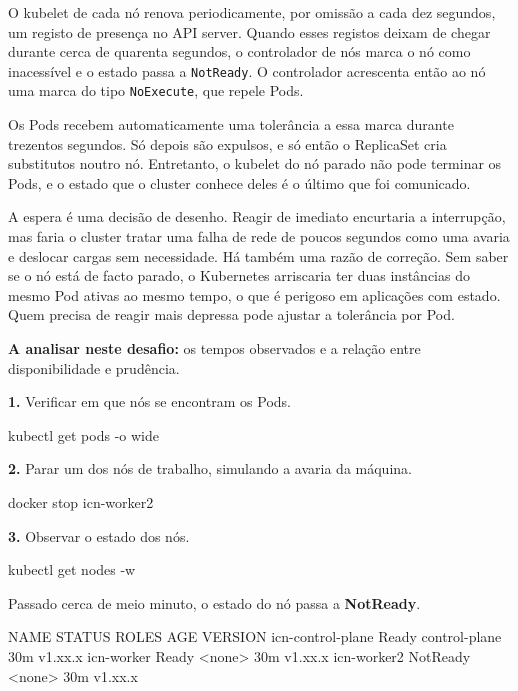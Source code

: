 \documentclass[11pt,a4paper]{article}
\newcommand{\cmd}[1]{\texttt{#1}}
\begin{document}
\begin{teoria}
O kubelet de cada nó renova periodicamente, por omissão a cada dez segundos, um registo de presença no API server. Quando esses registos deixam de chegar durante cerca de quarenta segundos, o controlador de nós marca o nó como inacessível e o estado passa a \cmd{NotReady}. O controlador acrescenta então ao nó uma marca do tipo \cmd{NoExecute}, que repele Pods.

Os Pods recebem automaticamente uma tolerância a essa marca durante trezentos segundos. Só depois são expulsos, e só então o ReplicaSet cria substitutos noutro nó. Entretanto, o kubelet do nó parado não pode terminar os Pods, e o estado que o cluster conhece deles é o último que foi comunicado.

A espera é uma decisão de desenho. Reagir de imediato encurtaria a interrupção, mas faria o cluster tratar uma falha de rede de poucos segundos como uma avaria e deslocar cargas sem necessidade. Há também uma razão de correção. Sem saber se o nó está de facto parado, o Kubernetes arriscaria ter duas instâncias do mesmo Pod ativas ao mesmo tempo, o que é perigoso em aplicações com estado. Quem precisa de reagir mais depressa pode ajustar a tolerância por Pod.

\textbf{A analisar neste desafio:} os tempos observados e a relação entre disponibilidade e prudência.
\end{teoria}

\textbf{1.} Verificar em que nós se encontram os Pods.

\begin{terminal}
kubectl get pods -o wide
\end{terminal}

\textbf{2.} Parar um dos nós de trabalho, simulando a avaria da máquina.

\begin{terminal}
docker stop icn-worker2
\end{terminal}

\textbf{3.} Observar o estado dos nós.

\begin{terminal}
kubectl get nodes -w
\end{terminal}

Passado cerca de meio minuto, o estado do nó passa a \textbf{NotReady}.

\begin{saida}
NAME                  STATUS     ROLES           AGE   VERSION
icn-control-plane     Ready      control-plane   30m   v1.xx.x
icn-worker            Ready      <none>          30m   v1.xx.x
icn-worker2           NotReady   <none>          30m   v1.xx.x
\end{saida}
\end{document}
